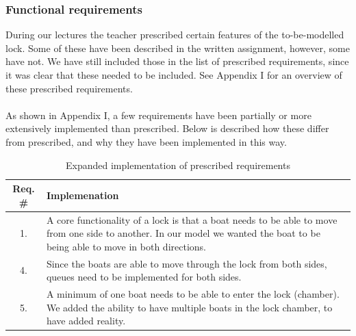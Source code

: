\documentclass{article}
\begin{document}
        \subsubsection{Functional requirements}
        During our lectures the teacher prescribed certain features of the to-be-modelled lock. Some of these have been described in the written assignment, however, some have not. We have still included those in the list of prescribed requirements, since it was clear that these needed to be included. See Appendix I for an overview of these prescribed requirements.\\\\
        As shown in Appendix I, a few requirements have been partially or more extensively implemented than prescribed. Below is described how these differ from prescribed, and why they have been implemented in this way.
        
        \begin{table}[h]
            \centering
            \begin{tabular}{c|p{9cm}}
                 \textbf{Req. \#} & \textbf{Implemenation} \\
                 \hline
                 1. & A core functionality of a lock is that a boat needs to be able to move from one side to another. In our model we wanted the boat to be being able to move in both directions. \\
                 \hline 
                 4. & Since the boats are able to move through the lock from both sides, queues need to be implemented for both sides. \\
                 \hline 
                 5. & A minimum of one boat needs to be able to enter the lock (chamber). We added the ability to have multiple boats in the lock chamber, to have added reality. \\
            \end{tabular}
            \caption{Expanded implementation of prescribed requirements}
            \label{tab:expanded_reqs}
        \end{table}
        
\end{document}
